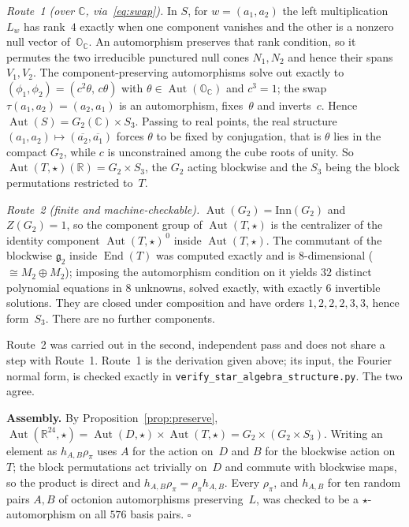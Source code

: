 \documentclass[11pt]{amsart}
\newcommand{\OO}{\mathbb{O}}
\newcommand{\RR}{\mathbb{R}}
\newcommand{\CC}{\mathbb{C}}
\DeclareMathOperator{\Aut}{Aut}
\DeclareMathOperator{\End}{End}
\theoremstyle{definition}
\theoremstyle{remark}
\begin{document}
\emph{Route~1 (over $\CC$, via~\eqref{eq:swap}).}
In $S$, for $w = (a_1, a_2)$ the left multiplication $L_w$ has rank~$4$
exactly when one component vanishes and the other is a nonzero null vector
of~$\OO_\CC$. An automorphism preserves that rank condition, so it permutes
the two irreducible punctured null cones $N_1, N_2$ and hence their
spans~$V_1, V_2$. The component-preserving automorphisms solve out exactly to
$(\phi_1, \phi_2) = (c^2\theta,\, c\theta)$ with
$\theta \in \Aut(\OO_\CC)$ and $c^3 = 1$; the swap
$\tau(a_1,a_2) = (a_2,a_1)$ is an automorphism, fixes~$\theta$ and inverts~$c$.
Hence $\Aut(S) = G_2(\CC) \times S_3$. Passing to real points, the real
structure $(a_1,a_2) \mapsto (\overline{a_2}, \overline{a_1})$ forces
$\theta$ to be fixed by conjugation, that is $\theta$ lies in the compact
$G_2$, while $c$ is unconstrained among the cube roots of unity. So
$\Aut(T, \star)(\RR) = G_2 \times S_3$, the $G_2$ acting blockwise and the
$S_3$ being the block permutations restricted to~$T$.

\emph{Route~2 (finite and machine-checkable).}
$\Aut(G_2) = \mathrm{Inn}(G_2)$ and $Z(G_2) = 1$, so the component group of
$\Aut(T,\star)$ is the centralizer of the identity component
$\Aut(T,\star)^{\,0}$ inside $\Aut(T,\star)$. The commutant of the blockwise
$\mathfrak{g}_2$ inside $\End(T)$ was computed exactly and is
$8$-dimensional ($\cong M_2 \oplus M_2$); imposing the automorphism condition
on it yields $32$ distinct polynomial equations in $8$ unknowns, solved
exactly, with exactly $6$ invertible solutions. They are closed under
composition and have orders $1, 2, 2, 2, 3, 3$, hence form~$S_3$. There are
no further components.

Route~2 was carried out in the second, independent pass and does not share a
step with Route~1. Route~1 is the derivation given above; its input, the
Fourier normal form, is checked exactly in
\texttt{verify\_star\_algebra\_structure.py}. The two agree.

\medskip
\noindent\textbf{Assembly.}
By Proposition~\ref{prop:preserve},
$\Aut(\RR^{24},\star) = \Aut(D,\star) \times \Aut(T,\star)
= G_2 \times (G_2 \times S_3)$. Writing an element as $h_{A,B}\rho_\pi$ uses
$A$ for the action on~$D$ and $B$ for the blockwise action on~$T$; the block
permutations act trivially on~$D$ and commute with blockwise maps, so the
product is direct and $h_{A,B}\rho_\pi = \rho_\pi h_{A,B}$. Every $\rho_\pi$,
and $h_{A,B}$ for ten random pairs $A, B$ of octonion automorphisms
preserving~$L$, was checked to be a $\star$-automorphism on all $576$ basis
pairs. $\square$
\end{document}
